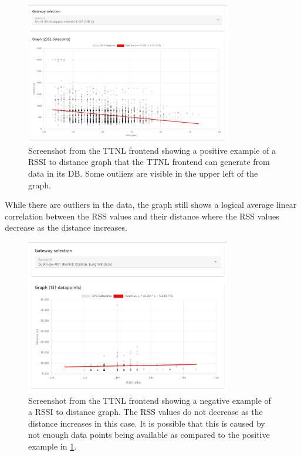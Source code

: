 \begin{figure}[htbp]
    \centering
    \includegraphics[width=0.8\textwidth]{pictures/ttn-locator/frontend/data/gateway_ghb_rssi_range_graph.png}
    \caption{
        Screenshot from the \ac{TTNL} frontend showing a positive example of a \ac{RSSI} to distance graph that the \ac{TTNL} frontend can generate from data in its \ac{DB}.
        Some outliers are visible in the upper left of the graph.
    }\label{fig:rssi-range-graph-positive-example}
\end{figure}

While there are outliers in the data, the graph still shows a logical average linear correlation between the \ac{RSS} values and their distance where the \ac{RSS} values decrease as the distance increases.

\begin{figure}[htbp]
    \centering
    \includegraphics[width=0.8\textwidth]{pictures/ttn-locator/frontend/data/gateway_buehl_gw_rssi_range_graph.png}
    \caption{
        Screenshot from the \ac{TTNL} frontend showing a negative example of a \ac{RSSI} to distance graph.
        The \ac{RSS} values do not decrease as the distance increases in this case.
        It is possible that this is caused by not enough data points being available as compared to the positive example in \cref{fig:rssi-range-graph-positive-example}.
    }\label{fig:rssi-range-graph-negative-example}
\end{figure}

